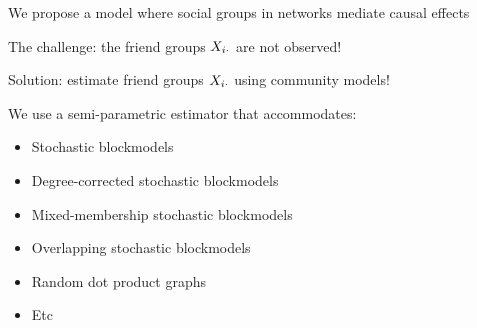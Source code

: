 \documentclass[aspectratio=169]{beamer}
\theoremstyle{remark}
\begin{document}
\begin{frame}{We propose a model where social groups in networks mediate causal effects}



\end{frame}

\begin{frame}{The challenge: the friend groups $X_{i \cdot}$ are not observed!}

    Solution: estimate friend groups $X_{i \cdot}$ using community models!

    We use a semi-parametric estimator that accommodates:

    \begin{itemize}
        \item Stochastic blockmodels
        \item Degree-corrected stochastic blockmodels
        \item Mixed-membership stochastic blockmodels
        \item Overlapping stochastic blockmodels
        \item Random dot product graphs
        \item Etc
    \end{itemize}

\end{frame}
\end{document}
